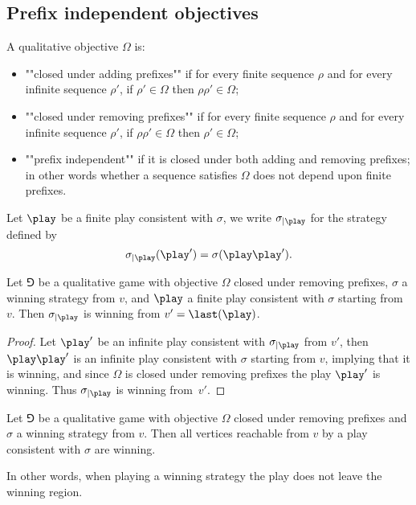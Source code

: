 \subsection*{Prefix independent objectives}
A qualitative objective $\Omega$ is:
\begin{itemize}
	\item ""closed under adding prefixes"" if for every finite sequence $\rho$ and for every infinite sequence $\rho'$,
if $\rho' \in \Omega$ then $\rho \rho' \in \Omega$;
	\item ""closed under removing prefixes"" if for every finite sequence $\rho$ and for every infinite sequence $\rho'$,
if $\rho \rho' \in \Omega$ then $\rho' \in \Omega$;
	\item ""prefix independent"" if it is closed under both adding and removing prefixes;
in other words whether a sequence satisfies $\Omega$ does not depend upon finite prefixes.
\end{itemize}

Let $\play$ be a finite play consistent with $\sigma$, we write $\sigma_{\mid \play}$ for the strategy defined by
\[
\sigma_{\mid \play}(\play') = \sigma(\play \play').
\]

\begin{fact}
\label{1-fact:winning_prefix_independent_qualitative}
Let $\Game$ be a qualitative game with objective $\Omega$ closed under removing prefixes,
$\sigma$ a winning strategy from $v$,
and $\play$ a finite play consistent with $\sigma$ starting from $v$.
Then $\sigma_{\mid \play}$ is winning from $v' = \last(\play)$.
\end{fact}
\begin{proof}
Let $\play'$ be an infinite play consistent with $\sigma_{\mid \play}$ from $v'$,
then $\play \play'$ is an infinite play consistent with $\sigma$ starting from $v$, 
implying that it is winning, and since $\Omega$ is closed under removing prefixes
the play $\play'$ is winning. Thus $\sigma_{\mid \play}$ is winning from~$v'$.
\end{proof}

\begin{corollary}
Let $\Game$ be a qualitative game with objective $\Omega$ closed under removing prefixes and $\sigma$ a winning strategy from $v$.
Then all vertices reachable from $v$ by a play consistent with $\sigma$ are winning.
\end{corollary}
In other words, when playing a winning strategy the play does not leave the winning region.


